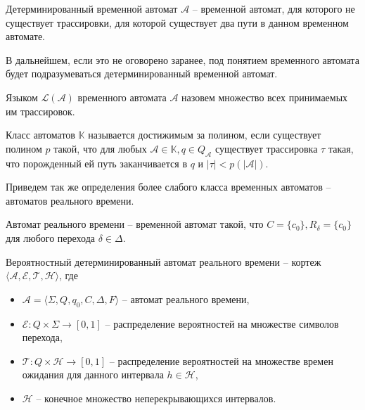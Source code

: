 \documentclass[times,specification,annotation]{itmo-student-thesis}
\begin{document}
\begin{definition}
  Детерминированный временной автомат $\mathcal{A}$ -- временной автомат, для которого не существует трассировки, для которой существует два пути в данном временном автомате.
  \label{DTA}
\end{definition}

В дальнейшем, если это не оговорено заранее, под понятием временного автомата будет подразумеваться детерминированный временной автомат.

\begin{definition}
  Языком $\mathcal{L}(\mathcal{A})$ временного автомата $\mathcal{A}$ назовем множество всех принимаемых им трассировок.
\end{definition}

\begin{definition}
  Класс автоматов $\mathbb{K}$ называется достижимым за полином, если существует полином $p$ такой, что для любых
  $\mathcal{A} \in \mathbb{K}, q \in Q_{\mathcal{A}}$ существует трассировка $\tau$ такая, что порожденный ей путь заканчивается в $q$ и $|\tau| < p(|\mathcal{A}|)$.
\end{definition}

Приведем так же определения более слабого класса временных автоматов -- автоматов реального времени.

\begin{definition}
  Автомат реального времени -- временной автомат такой, что $C = \{c_0\}, R_{\delta} = \{c_0\}$ для любого перехода $\delta \in \Delta$.
  \label{rti}
\end{definition}

\begin{definition}
  Вероятностный детерминированный автомат реального времени -- кортеж $\langle \mathcal{A}, \mathcal{E}, \mathcal{T}, \mathcal{H} \rangle$, где
  \begin{itemize}
    \item $\mathcal{A} = \langle \Sigma, Q, q_0, C, \Delta, F \rangle$ -- автомат реального времени,
    \item $\mathcal{E}: Q \times \Sigma \rightarrow [0, 1]$ -- распределение вероятностей на множестве символов перехода,
    \item $\mathcal{T}: Q \times \mathcal{H} \rightarrow [0, 1]$ -- распределение вероятностей на множестве времен ожидания для данного интервала $h \in \mathcal{H}$,
    \item $\mathcal{H}$ -- конечное множество неперекрывающихся интервалов.
  \end{itemize}
  \label{rti++}
\end{definition}
\end{document}
